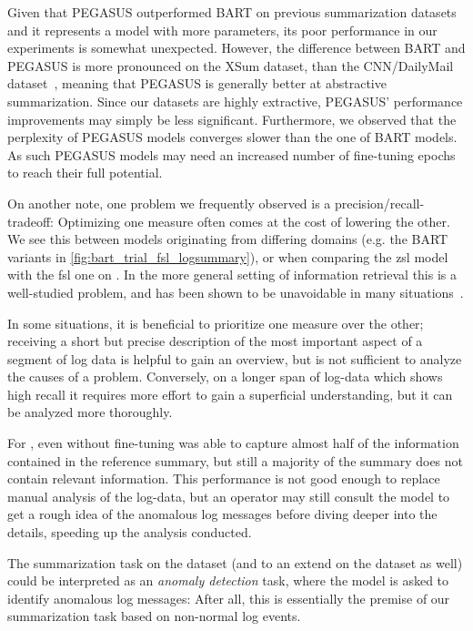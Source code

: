 Given that PEGASUS outperformed BART on previous summarization datasets and it represents a model with more parameters,
its poor performance in our experiments is somewhat unexpected.
However, the difference between BART and PEGASUS is more pronounced on the XSum dataset,
than the CNN/DailyMail dataset~\parencites{bart}{pegasus}, meaning that PEGASUS is generally better at abstractive summarization.
Since our datasets are highly extractive, PEGASUS' performance improvements may simply be less significant.
Furthermore, we observed that the perplexity of PEGASUS models converges slower than the one of BART models.
As such PEGASUS models may need an increased number of fine-tuning epochs to reach their full potential.

On another note, one problem we frequently observed is a precision/recall-tradeoff:
Optimizing one measure often comes at the cost of lowering the other.
We see this between models originating from differing domains (e.g. the BART variants in \autoref{fig:bart_trial_fsl_logsummary}),
or when comparing the \ac{zsl}  model with the \ac{fsl} one on \telco{}.
In the more general setting of information retrieval this is a well-studied problem,
and has been shown to be unavoidable in many situations~\parencite{precision_recall_tradeoff}.

In some situations, it is beneficial to prioritize one measure over the other;
receiving a short but precise description of the most important aspect of a segment of log data is helpful to gain an overview,
but is not sufficient to analyze the causes of a problem.
Conversely, on a longer span of log-data which shows high recall it requires more effort to gain a superficial understanding,
but it can be analyzed more thoroughly.

For \telco{}, even without fine-tuning
 was able to capture almost half of the information contained in the reference summary,
but still a majority of the summary does not contain relevant information.
This performance is not good enough to replace manual analysis of the log-data,
but an operator may still consult the model
to get a rough idea of the anomalous log messages before diving deeper into the details,
speeding up the analysis conducted.

The summarization task on the \hadoop{} dataset (and to an extend on the \telco{} dataset as well) could be interpreted as an \emph{anomaly detection} task,
where the model is asked to identify anomalous log messages:
After all, this is essentially the premise of our summarization task based on non-normal log events.

